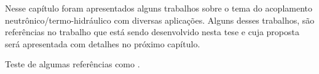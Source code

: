 Nesse capítulo foram apresentados alguns trabalhos sobre o tema do acoplamento neutrônico/termo-hidráulico 
com diversas aplicações. Alguns desses trabalhos, são referências no trabalho que está sendo desenvolvido 
nesta tese e cuja proposta será apresentada com detalhes no próximo capítulo.

Teste de algumas referências como \cite{Fiorina2015}.

%

%    
%    
  

